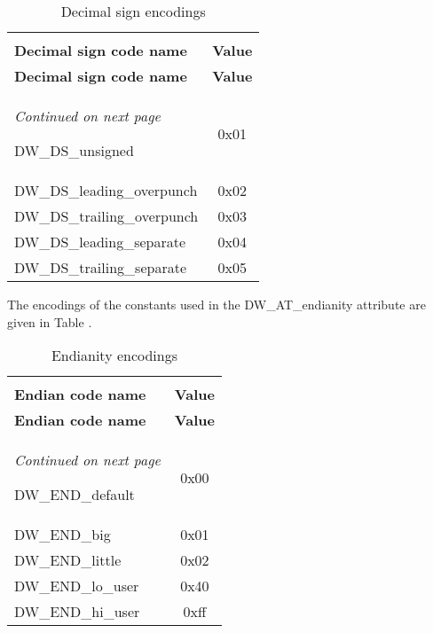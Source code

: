 \begin{centering}
\setlength{\extrarowheight}{0.1cm}
\begin{longtable}{l|c}
  \caption{Decimal sign encodings} \label{tab:decimalsignencodings} \\
  \hline \\ \bfseries Decimal sign code name&\bfseries Value \\ \hline
\endfirsthead
  \bfseries Decimal sign code name&\bfseries Value\\ \hline
\endhead
  \hline \emph{Continued on next page}
\endfoot
  \hline
\endlastfoot

DW\-\_DS\-\_unsigned & 0x01  \\
DW\-\_DS\-\_leading\-\_overpunch & 0x02  \\
DW\-\_DS\-\_trailing\-\_overpunch & 0x03  \\
DW\-\_DS\-\_leading\-\_separate & 0x04  \\
DW\-\_DS\-\_trailing\-\_separate & 0x05  \\

\end{longtable}
\end{centering}

The encodings of the constants used in the 
DW\-\_AT\-\_endianity attribute are given in 
Table .

\begin{centering}
\setlength{\extrarowheight}{0.1cm}
\begin{longtable}{l|c}
  \caption{Endianity encodings} \label{tab:endianityencodings}\\
  \hline \\ \bfseries Endian code name&\bfseries Value \\ \hline
\endfirsthead
  \bfseries Endian code name&\bfseries Value\\ \hline
\endhead
  \hline \emph{Continued on next page}
\endfoot
  \hline
\endlastfoot

DW\-\_END\-\_default  & 0x00 \\
DW\-\_END\-\_big & 0x01 \\
DW\-\_END\-\_little & 0x02 \\
DW\-\_END\-\_lo\-\_user & 0x40 \\
DW\-\_END\-\_hi\-\_user & 0xff \\

\end{longtable}
\end{centering}

